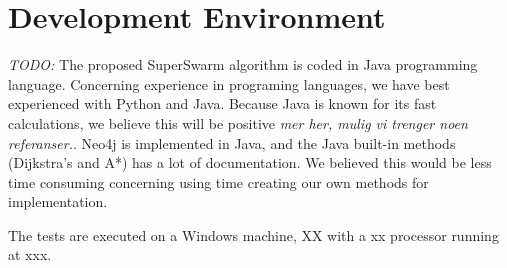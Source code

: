 \section{Development Environment}


\emph{\color{red}TODO:} The proposed SuperSwarm algorithm is coded in Java programming language.  Concerning experience in programing languages, we have best experienced with Python and Java. Because Java is known for its fast calculations, we believe this will be positive \emph{\color{red} mer her, mulig vi trenger noen referanser.}. Neo4j is implemented in Java, and the Java built-in methods (Dijkstra's and A*) has a lot of documentation. We believed this would be less time consuming  concerning using time creating our own methods for implementation. 


The tests are executed on a Windows machine,  XX with a xx processor running at xxx.